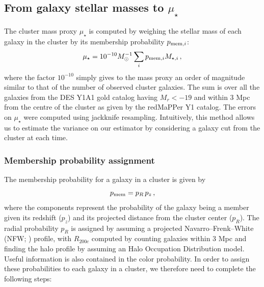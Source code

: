 \subsection{From galaxy stellar masses to $\mu_\star$}\label{tomustar}

The cluster mass proxy $\mu_\star$ is computed by weighing the stellar mass of each galaxy in the cluster by its membership probability $p_{{\rm mem}, i}$:
\begin{equation}
\mu_\star = 10^{-10} M_\odot^{-1} \sum_i  p_{{\rm mem}, i} M_{\star,i}\,,\label{eq:mustar}
\end{equation}
where the factor $10^{-10}$ simply gives to the mass proxy an order of magnitude similar to that of the number of observed cluster galaxies. The sum is over all the galaxies from the DES Y1A1 gold catalog having $M_r<-19$ and within 3 Mpc from the centre of the cluster as given by the redMaPPer Y1 catalog. The errors on $\mu_\star$ were computed using jackknife resampling. Intuitively, this method allows us to estimate the variance on our estimator by considering a galaxy cut from the cluster at each time.

\subsubsection{Membership probability assignment}

The membership probability for a galaxy in a cluster is given by
\begin{equation}
p_{\rm mem} = p_{R}\,p_{z}\,,\label{eq:pmem}
\end{equation}
where the components represent the probability of the galaxy being a member given its redshift ($p_z$) and its projected distance from the cluster center ($p_R$). The radial probability $p_R$ is assigned by assuming a projected Navarro--Frenk--White (NFW; \citealt{nfw}) profile, with $R_{200c}$ computed by counting galaxies within 3 Mpc and finding the halo profile by assuming an Halo Occupation Distribution model. Useful information is also contained in the color probability. In order to assign these probabilities to each galaxy in a cluster, we therefore need to complete the following steps:

